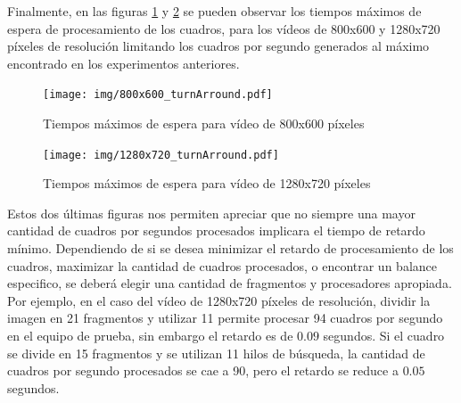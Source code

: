 Finalmente, en las figuras \ref{800turnArround} y \ref{1280turnArround} se
pueden observar los tiempos máximos de espera de procesamiento de los cuadros,
para los vídeos de 800x600 y 1280x720 píxeles de resolución limitando los
cuadros por segundo generados al máximo encontrado en los experimentos
anteriores.

\begin{figure}[!h]

	\texttt{[image: img/800x600\_turnArround.pdf]}
	\caption{Tiempos máximos de espera para vídeo de 800x600 píxeles}
	\label{800turnArround}

\end{figure}


\begin{figure}[!h]

	\texttt{[image: img/1280x720\_turnArround.pdf]}
	\caption{Tiempos máximos de espera para vídeo de 1280x720 píxeles}
	\label{1280turnArround}

\end{figure}

Estos dos últimas figuras nos permiten apreciar que no siempre una mayor
cantidad de cuadros por segundos procesados implicara el tiempo de retardo
mínimo. Dependiendo de si se desea minimizar el retardo de procesamiento de los
cuadros, maximizar la cantidad de cuadros procesados, o encontrar un balance
especifico, se deberá elegir una cantidad de fragmentos y procesadores
apropiada. Por ejemplo, en el caso del vídeo de 1280x720 píxeles de resolución,
dividir la imagen en 21 fragmentos y utilizar 11 permite procesar 94 cuadros por
segundo en el equipo de prueba, sin embargo el retardo es de $0.09$ segundos. Si
el cuadro se divide en 15 fragmentos y se utilizan 11 hilos de búsqueda, la
cantidad de cuadros por segundo procesados se cae a 90, pero el retardo se
reduce a $0.05$ segundos.
